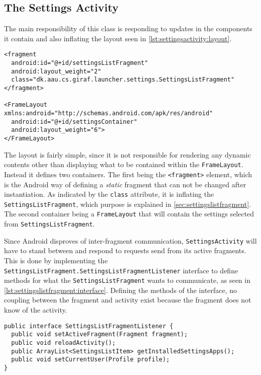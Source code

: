 \subsection{The Settings Activity}\label{sec:sprint3:settings}
The main responsibility of this class is responding to updates in the components it contain and also inflating the layout seen in \cref{lst:settingsactivity:layout}.

\begin{lstlisting}[caption={Excerpt of the layout defined for \lstinline|SettingsActivity|.}, label={lst:settingsactivity:layout}]
<fragment
  android:id="@+id/settingsListFragment"
  android:layout_weight="2"
  class="dk.aau.cs.giraf.launcher.settings.SettingsListFragment"
</fragment>

<FrameLayout xmlns:android="http://schemas.android.com/apk/res/android"
  android:id="@+id/settingsContainer"
  android:layout_weight="6">
</FrameLayout>
\end{lstlisting}

The layout is fairly simple, since it is not responsible for rendering any dynamic contents other than displaying what to be contained within the \lstinline|FrameLayout|.
Instead it defines two containers.
The first being the \lstinline|<fragment>| element, which is the Android way of defining a \textit{static} fragment that can not be changed after instantiation.
As indicated by the \lstinline|class| attribute, it is inflating the \lstinline|SettingsListFragment|, which purpose is explained in \cref{sec:settingslistfragment}.
The second container being a \lstinline|FrameLayout| that will contain the settings selected from \lstinline|SettingsListFragment|.

Since Android disproves of inter-fragment communication, \lstinline|SettingsActivity| will have to stand between and respond to requests send from its active fragments.
This is done by implementing the \lstinline|SettingsListFragment.SettingsListFragmentListener| interface to define methods for what the \lstinline|SettingsListFragment| wants to communicate, as seen in \cref{lst:settingslistfragment:interface}.
Defining the methods of the interface, no coupling between the fragment and activity exist because the fragment does not know of the activity.

\begin{lstlisting}[caption={The interface implemented in \lstinline|SettingsActivity| defined in \lstinline|SettingsListFragment|.}, label={lst:settingslistfragment:interface}]
public interface SettingsListFragmentListener {
  public void setActiveFragment(Fragment fragment);
  public void reloadActivity();
  public ArrayList<SettingsListItem> getInstalledSettingsApps();
  public void setCurrentUser(Profile profile);
}
\end{lstlisting}

